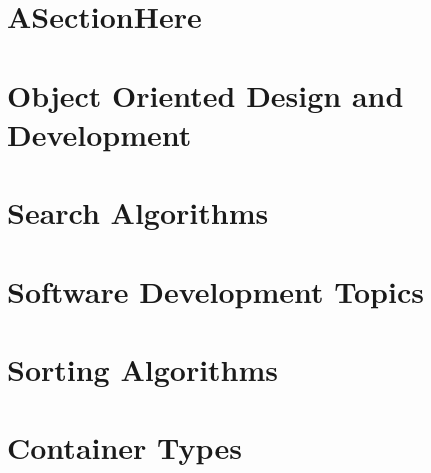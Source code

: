 \chapter{ASectionHere}
\label{sec:ASectionHere}
\lipsum[1]

\chapter{Object Oriented Design and Development}
\label{chap:ObjectOrientedDesignandDevelopment}
\lipsum[1]

\chapter{Search Algorithms}
\label{chap:SearchAlgorithms}
\lipsum[1]

\chapter{Software Development Topics}
\label{chap:SoftwareDevelopmentTopics}
\lipsum[1]

\chapter{Sorting Algorithms}
\label{chap:SortingAlgorithms}
\lipsum[1]

\chapter{Container Types}
\label{chap:ContainerTypes}
\lipsum[1]

